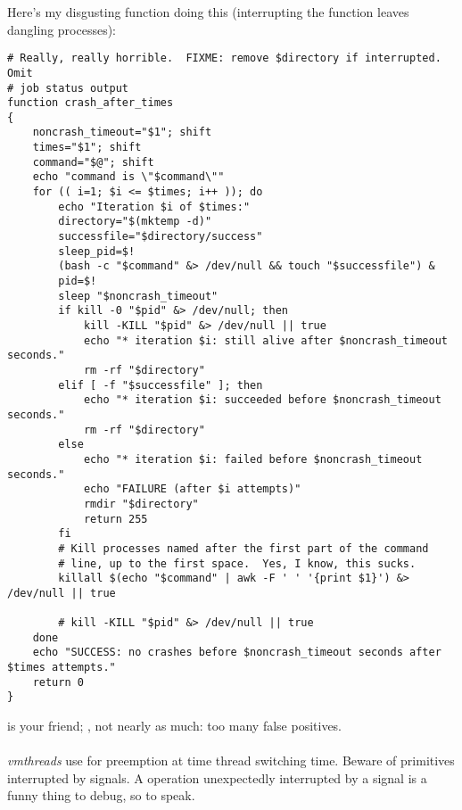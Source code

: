 \documentclass[a4paper,twoside,12pt]{article}
\begin{document}
Here's my disgusting  function doing this (interrupting the function
leaves dangling processes):
\begin{Verbatim}
# Really, really horrible.  FIXME: remove $directory if interrupted.  Omit
# job status output
function crash_after_times
{
    noncrash_timeout="$1"; shift
    times="$1"; shift
    command="$@"; shift
    echo "command is \"$command\""
    for (( i=1; $i <= $times; i++ )); do
        echo "Iteration $i of $times:"
        directory="$(mktemp -d)"
        successfile="$directory/success"
        sleep_pid=$!
        (bash -c "$command" &> /dev/null && touch "$successfile") &
        pid=$!
        sleep "$noncrash_timeout"
        if kill -0 "$pid" &> /dev/null; then
            kill -KILL "$pid" &> /dev/null || true
            echo "* iteration $i: still alive after $noncrash_timeout seconds."
            rm -rf "$directory"
        elif [ -f "$successfile" ]; then
            echo "* iteration $i: succeeded before $noncrash_timeout seconds."
            rm -rf "$directory"
        else
            echo "* iteration $i: failed before $noncrash_timeout seconds."
            echo "FAILURE (after $i attempts)"
            rmdir "$directory"
            return 255
        fi
        # Kill processes named after the first part of the command
        # line, up to the first space.  Yes, I know, this sucks.
        killall $(echo "$command" | awk -F ' ' '{print $1}') &> /dev/null || true

        # kill -KILL "$pid" &> /dev/null || true
    done
    echo "SUCCESS: no crashes before $noncrash_timeout seconds after $times attempts."
    return 0
}
\end{Verbatim}

 is your friend;  , not nearly as much: too many false positives.
\\
\\
\textit{vmthreads} use  for preemption at time thread
switching time.  Beware of primitives interrupted by signals.  A
 operation unexpectedly interrupted by a signal is a
funny thing to debug, so to speak.

\end{document}
